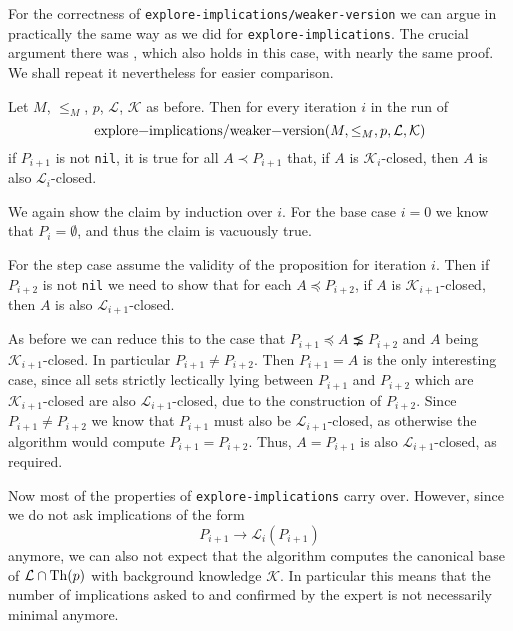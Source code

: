 For the correctness of \lstinline{explore-implications/weaker-version} we can argue in
practically the same way as we did for \lstinline{explore-implications}.  The crucial
argument there was , which also holds
in this case, with nearly the same proof.  We shall repeat it nevertheless for easier
comparison.

\begin{Proposition}
  \label{prop:explore-implications-weaker-version-closedness-persists}
  Let $M$, $\leq_{M}$, $p$, $\mathcal{L}$, $\mathcal{K}$ as before.  Then for every
  iteration $i$ in the run of
  \begin{equation*}
    \text{\lstinline{explore-implications/weaker-version}}(M, \leq_{M}, p, \mathcal{L}, \mathcal{K})
  \end{equation*}
  if $P_{i+1}$ is not \lstinline{nil}, it is true for all $A \prec P_{i+1}$ that, if $A$
  is $\mathcal{K}_{i}$-closed, then $A$ is also $\mathcal{L}_{i}$-closed.
\end{Proposition}
\begin{Proof}
  We again show the claim by induction over $i$.  For the base case $i = 0$ we know that
  $P_{i} = \emptyset$, and thus the claim is vacuously true.

  For the step case assume the validity of the proposition for iteration $i$.  Then if
  $P_{i+2}$ is not \lstinline{nil} we need to show that for each $A \preceq P_{i+2}$, if
  $A$ is $\mathcal{K}_{i+1}$-closed, then $A$ is also $\mathcal{L}_{i+1}$-closed.

  As before we can reduce this to the case that $P_{i+1} \preceq A \precneq P_{i+2}$ and
  $A$ being $\mathcal{K}_{i+1}$-closed.  In particular $P_{i+1} \neq P_{i+2}$.  Then
  $P_{i+1} = A$ is the only interesting case, since all sets strictly lectically lying
  between $P_{i+1}$ and $P_{i+2}$ which are $\mathcal{K}_{i+1}$-closed are also
  $\mathcal{L}_{i+1}$-closed, due to the construction of $P_{i+2}$.  Since $P_{i+1} \neq
  P_{i+2}$ we know that $P_{i+1}$ must also be $\mathcal{L}_{i+1}$-closed, as otherwise
  the algorithm would compute $P_{i+1} = P_{i+2}$.  Thus, $A = P_{i+1}$ is also
  $\mathcal{L}_{i+1}$-closed, as required.
\end{Proof}

Now most of the properties of \lstinline{explore-implications} carry over.  However, since
we do not ask implications of the form
\begin{equation}
  \label{eq:39}
  P_{i+1} \to \mathcal{L}_{i}(P_{i+1})
\end{equation}
anymore, we can also not expect that the algorithm computes the canonical base of
$\mathcal{L} \cap \operatorname{Th}(p)$ with background knowledge $\mathcal{K}$.  In particular this
means that the number of implications asked to and confirmed by the expert is not
necessarily minimal anymore.

